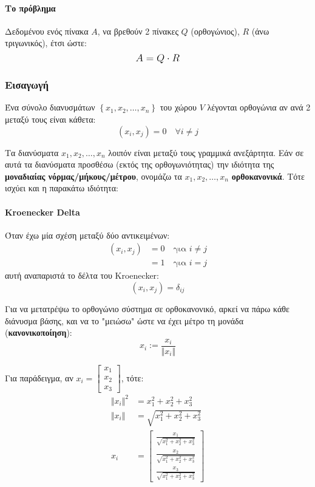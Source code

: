 \documentclass[11pt,a4paper,notitlepage,fleqn]{article}
\begin{document}
\paragraph{Το πρόβλημα}
Δεδομένου ενός πίνακα \( A \), να βρεθούν 2 πίνακες
\( Q \) (ορθογώνιος), \( R \) (άνω τριγωνικός), έτσι ώστε:
\[
\mathlarger{A = Q \cdot R}
\]

\subsubsection{Εισαγωγή}
Ένα σύνολο διανυσμάτων \( \left\lbrace x_1,x_2,\dots,
x_n \right\rbrace \) του χώρου \( V \) λέγονται ορθογώνια αν ανά
2 μεταξύ τους είναι κάθετα:
\[
(x_i,x_j) = 0 \quad \forall i \neq j
\]

Τα διανύσματα \( x_1,x_2,\dots, x_n \) λοιπόν είναι μεταξύ τους
γραμμικά ανεξάρτητα. Εάν σε αυτά τα διανύσματα προσθέσω (εκτός
της ορθογωνιότητας) την ιδιότητα της
\textbf{μοναδιαίας νόρμας/μήκους/μέτρου}, ονομάζω τα \( x_1,x_2,
\dots, x_n \) \textbf{ορθοκανονικά}. Τότε ισχύει και η παρακάτω
ιδιότητα:

\paragraph{Kroenecker Delta}

Όταν έχω μία σχέση μεταξύ δύο αντικειμένων:
\begin{align*}
	(x_i,x_j) &= 0 \quad \text{για } i \neq j \\
	          &= 1 \quad \text{για } i = j
\end{align*}
αυτή αναπαριστά το δέλτα του Kroenecker:
\[
(x_i,x_j) = \delta_{ij}
\]

Για να μετατρέψω το ορθογώνιο σύστημα σε ορθοκανονικό, αρκεί
να πάρω κάθε διάνυσμα βάσης, και να το "μειώσω" ώστε να έχει
μέτρο τη μονάδα (\textbf{κανονικοποίηση}):
\[
x_i := \frac{x_i}{\Vert x_i \Vert}
\]

Για παράδειγμα, αν \( x_i=\left[\begin{matrix}
x_1\\x_2\\x_3
\end{matrix}\right] \), τότε:
\begin{align*}
	\Vert x_i \Vert^2 &= x_1^2+x_2^2+x_3^2 \\
	\Vert x_i \Vert &= \sqrt{x_1^2+x_2^2+x_3^2} \\
	x_i &= \left[
	\begin{matrix}
	\frac{x_1}{\sqrt{x_1^2+x_2^2+x_3^2}} \\
	\frac{x_2}{\sqrt{x_1^2+x_2^2+x_3^2}} \\
	\frac{x_3}{\sqrt{x_1^2+x_2^2+x_3^2}}
	\end{matrix}
	\right]
\end{align*}
\end{document}
